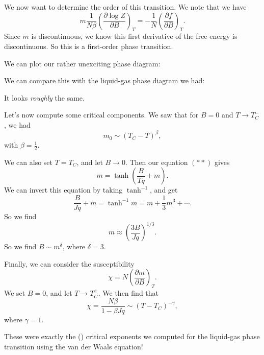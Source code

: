 \documentclass[a4paper]{article}
\begin{document}
We now want to determine the order of this transition. We note that we have
\[
  m \frac{1}{N\beta}\left(\frac{\partial \log Z}{\partial B}\right)_T = - \frac{1}{N} \left(\frac{\partial f}{\partial B}\right)_T.
\]
Since $m$ is discontinuous, we know this first derivative of the free energy is discontinuous. So this is a first-order phase transition.

We can plot our rather unexciting phase diagram:
\begin{center}
\end{center}
We can compare this with the liquid-gas phase diagram we had:
\begin{center}
\end{center}
It looks \emph{roughly} the same.

Let's now compute some critical components. We saw that for $B = 0$ and $T \to T_C^-$, we had
\[
  m_0 \sim (T_C - T)^\beta,
\]
with $\beta = \frac{1}{2}$.

We can also set $T = T_C$, and let $B \to 0$. Then our equation $(**)$ gives
\[
  m = \tanh\left(\frac{B}{Tq} + m\right).
\]
We can invert this equation by taking $\tanh^{-1}$, and get
\[
  \frac{B}{Jq} + m = \tanh^{-1} m = m + \frac{1}{3} m^3 + \cdots.
\]
So we find
\[
  m \approx \left(\frac{3B}{Jq}\right)^{1/3}.
\]
So we find $B \sim m^\delta$, where $\delta = 3$.

Finally, we can consider the susceptibility
\[
  \chi = N \left(\frac{\partial m}{\partial B}\right)_T.
\]
We set $B = 0$, and let $T \to T_C^+$. We then find that
\[
  \chi = \frac{N \beta}{1 - \beta J q} \sim (T - T_C)^{-\gamma},
\]
where $\gamma = 1$.

These were exactly the () critical exponents we computed for the liquid-gas phase transition using the van der Waals equation!
\end{document}
